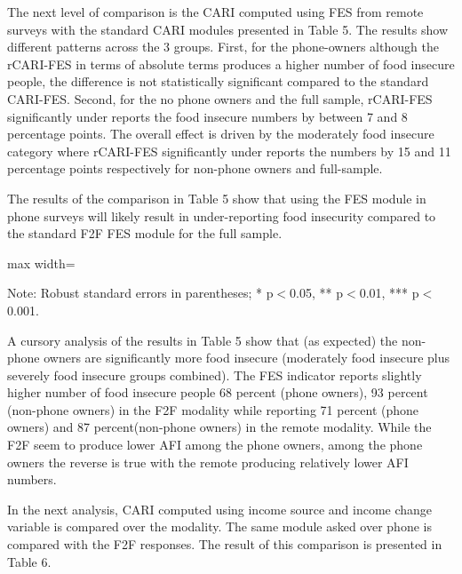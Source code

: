 \documentclass[11pt,harvard]{article}
\begin{document}
The next level of comparison is the CARI computed using FES from remote surveys with the standard CARI modules presented in Table 5. The results show different patterns across the 3 groups. First, for the phone-owners although the rCARI-FES in terms of absolute terms produces a higher number of food insecure people, the difference is not statistically significant compared to the standard CARI-FES. Second, for the no phone owners and the full sample, rCARI-FES significantly under reports the food insecure numbers by between 7 and 8 percentage points. The overall effect is driven by the moderately food insecure category where rCARI-FES significantly under reports the numbers by 15 and 11 percentage points respectively for non-phone owners and full-sample. 

The results of the comparison in Table 5 show that using the FES module in phone surveys will likely result in under-reporting food insecurity compared to the standard F2F FES module for the full sample.
	
	\begin{table}[htbp]
		\centering
		\begin{adjustbox}{max width=\textwidth}
			\begin{threeparttable}
				\caption{Impact of Survey Modality: CARI-FES vs. rCARI-FES}
				\scriptsize
				 
				\label{tab:CARI_FES_rCARI_Modality_CAR}
				\begin{tablenotes}
					\item Note: Robust standard errors in parentheses; * p$<$0.05, ** p$<$0.01, *** p$<$0.001. 
				\end{tablenotes}
			\end{threeparttable}
		\end{adjustbox}
	\end{table}

A cursory analysis of the results in Table 5 show that (as expected) the non-phone owners are significantly more food insecure (moderately food insecure plus severely food insecure groups combined). The FES indicator reports slightly higher number of food insecure people 68 percent (phone owners), 93 percent (non-phone owners) in the F2F modality while reporting 71 percent (phone owners) and 87 percent(non-phone owners) in the remote modality. While the F2F seem to produce lower AFI among the phone owners, among the phone owners the reverse is true with the remote producing relatively lower AFI numbers.

In the next analysis, CARI computed using income source and income change variable is compared over the modality. The same module asked over phone is compared with the F2F responses. The result of this comparison is presented in Table 6.
\end{document}
